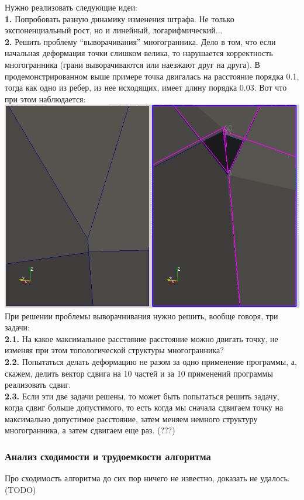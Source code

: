 \documentclass[a4paper,12pt, titlepage]{article}
\begin{document}
Нужно реализовать следующие идеи:\\
	\textbf{1. }Попробовать разную динамику изменения штрафа. Не только 
экспоненциальный рост, но и линейный, логарифмический...\\
	\textbf{2. }Решить проблему ``выворачивания'' многогранника. Дело в том, что если 
начальная деформация точки слишком велика, то нарушается корректность многогранника 
(грани выворачиваются или наезжают друг на друга). В продемонстрированном выше примере точка двигалась
на расстояние порядка 0.1, тогда как одно из ребер, из нее исходящих, имеет длину порядка 0.03. 
Вот что при этом наблюдается:\\
\includegraphics[clip, width=15cm]{img/2-1.png}
При решении проблемы выворачнивания нужно решить, вообще говоря, три задачи:\\
	\textbf{2.1. }На какое максимальное расстояние расстояние можно двигать точку, не изменяя при этом топологической структуры 
многогранника?\\
	\textbf{2.2. }Попытаться делать деформацию не разом за одно применение программы, а, скажем, делить вектор сдвига на 10 частей
и за 10 применений программы реализовать сдвиг.\\
	\textbf{2.3. }Если эти две задачи решены, то может быть попытаться решить задачу, когда сдвиг больше допустимого, то есть когда
мы сначала сдвигаем точку на максимально допустимое расстояние, затем меняем немного структуру многогранника, а затем сдвигаем еще раз.
(???)

\subsubsection{Анализ сходимости и трудоемкости алгоритма}
Про сходимость алгоритма до сих пор ничего не известно, доказать не удалось.
(TODO)
\end{document}
